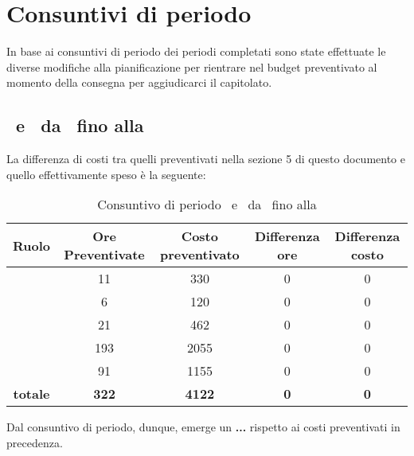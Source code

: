 \newpage
\section{Consuntivi di periodo}

In base ai consuntivi di periodo dei periodi completati sono state effettuate le diverse modifiche alla pianificazione per rientrare nel budget preventivato al momento della consegna per aggiudicarci il capitolato.

\subsection{\PD\ e \COD\ da \RP\ fino alla \RQ}
La differenza di costi tra quelli preventivati nella sezione 5 di questo documento e quello effettivamente speso è la seguente:

\begin{table}[h]
	\begin{center}
		\begin{tabular}{|c|c|c|c|c|}
			\hline
			\textbf{Ruolo}	& \textbf{Ore Preventivate} & \textbf{Costo preventivato} &  \textbf{Differenza ore} & \textbf{Differenza costo}\\
			\hline
			\Pm &	11 & 330 & 0 & 0\\
			\hline
			\Am	&	6 & 120 & 0 & 0\\
			\hline
			\Prog	&	21 & 462 & 0 & 0\\
			\hline
			\Progr	&	193 & 2055 & 0 & 0\\
			\hline
			\Ver	&	91 & 1155 & 0 & 0\\
			\hline
			\textbf{totale}	&	\textbf{322} & \textbf{4122} & \textbf{0} & \textbf{0} \\
			\hline
		\end{tabular}
	\end{center}
	\caption{Consuntivo di periodo \PD\ e \COD\ da \RP\ fino alla \RQ}
\end{table}

Dal consuntivo di periodo, dunque, emerge un \textbf{...} rispetto ai costi preventivati in precedenza.
